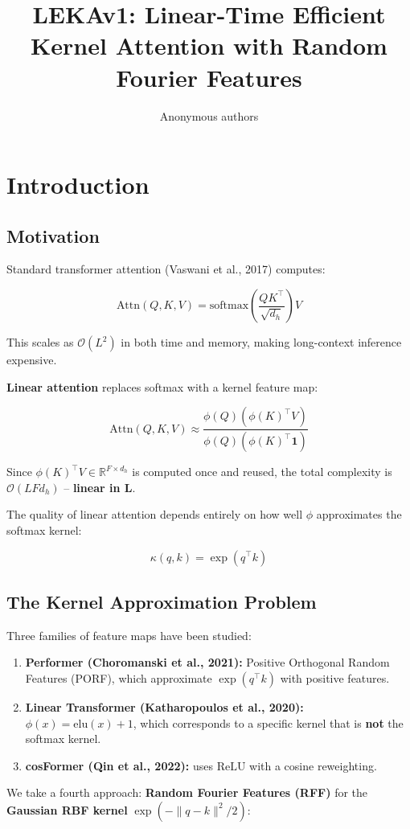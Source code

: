 \title{\textbf{LEKAv1: Linear-Time Efficient Kernel Attention with Random Fourier Features}}

\author{Anonymous authors}


\section{Introduction}

\subsection{Motivation}

Standard transformer attention (Vaswani et al., 2017) computes:

\[
\text{Attn}(Q, K, V) = \text{softmax}\!\left(\frac{Q K^\top}{\sqrt{d_h}}\right) V
\tag{1.1}
\]

This scales as $\mathcal{O}(L^2)$ in both time and memory, making 
long-context inference expensive.

\textbf{Linear attention} replaces softmax with a kernel feature map:

\[
\text{Attn}(Q, K, V) \approx \frac{\phi(Q) \left(\phi(K)^\top V\right)}{\phi(Q) \left(\phi(K)^\top \mathbf{1}\right)}
\tag{1.2}
\]

Since $\phi(K)^\top V \in \mathbb{R}^{F \times d_h}$ is computed once and 
reused, the total complexity is $\mathcal{O}(L F d_h)$ -- \textbf{linear in L}.

The quality of linear attention depends entirely on how well $\phi$ 
approximates the softmax kernel:

\[
\kappa(q, k) = \exp(q^\top k)
\tag{1.3}
\]

\subsection{The Kernel Approximation Problem}

Three families of feature maps have been studied:

\begin{enumerate}
\item \textbf{Performer (Choromanski et al., 2021):} Positive Orthogonal Random
  Features (PORF), which approximate $\exp(q^\top k)$ with positive
  features.
\item \textbf{Linear Transformer (Katharopoulos et al., 2020):} $\phi(x) = \text{elu}(x) + 1$,
  which corresponds to a specific kernel that is \textbf{not} the softmax
  kernel.
\item \textbf{cosFormer (Qin et al., 2022):} uses $\text{ReLU}$ with a cosine
  reweighting.

\end{enumerate}
We take a fourth approach: \textbf{Random Fourier Features (RFF)} for the 
\textbf{Gaussian RBF kernel} $\exp(-\|q - k\|^2 / 2)$:

